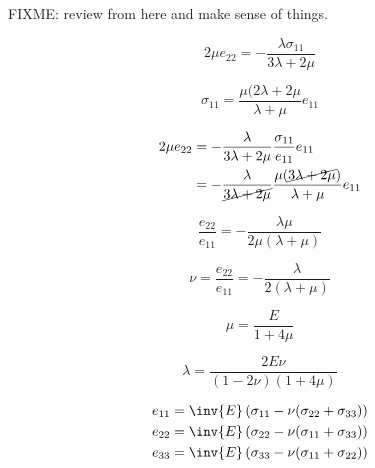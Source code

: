 FIXME: review from here and make sense of things.

\begin{equation}\label{eqn:continuumL5:n}
2 \mu e_{22} = - \frac{\lambda \sigma_{11}}{3 \lambda + 2 \mu}
\end{equation}

\begin{equation}\label{eqn:continuumL5:n}
\sigma_{11} = \frac{\mu (2 \lambda + 2 \mu}{\lambda + \mu} e_{11}
\end{equation}

\begin{align*}
2 \mu e_{22} 
&= - \frac{\lambda}{3 \lambda + 2 \mu} \frac{ \sigma_{11}}{e_{11}} e_{11} \\
&= - \frac{\lambda}{\cancel{3 \lambda + 2 \mu}} \frac{ \mu (\cancel{3 \lambda + 2\mu})}{\lambda + \mu} e_{11}
\end{align*}

\begin{equation}\label{eqn:continuumL5:n}
\frac{e_{22}}{e_{11}} = -\frac{ \lambda \mu }{2 \mu (\lambda + \mu)} 
\end{equation}

\begin{equation}\label{eqn:continuumL5:n}
\nu = \frac{e_{22}}{e_{11}} = - \frac{\lambda}{2 (\lambda + \mu)}
\end{equation}

\begin{equation}\label{eqn:continuumL5:n}
\mu = \frac{E}{1 + 4 \mu}
\end{equation}

\begin{equation}\label{eqn:continuumL5:n}
\lambda = \frac{2 E \nu}{(1 - 2 \nu)(1 + 4 \mu)}
\end{equation}
 
\begin{align}\label{eqn:continuumL5:n}
e_{11} &= \inv{E}\left( \sigma_{11} - \nu(\sigma_{22} + \sigma_{33}) \right) \\
e_{22} &= \inv{E}\left( \sigma_{22} - \nu(\sigma_{11} + \sigma_{33}) \right) \\
e_{33} &= \inv{E}\left( \sigma_{33} - \nu(\sigma_{11} + \sigma_{22}) \right)
\end{align}

\EndArticle
